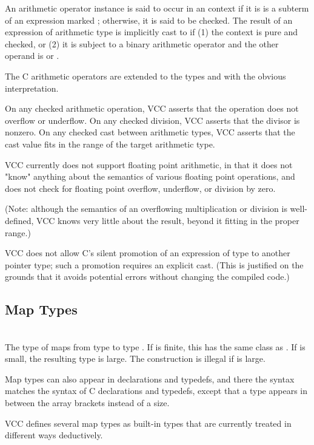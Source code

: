 \documentclass[preprint,nocopyrightspace]{sigplanconf}
\begin{document}
{An arithmetic operator instance is said to occur in
an \vcc{\unchecked} context if it is is a subterm of an expression
marked ; otherwise, it is said to be checked. The
result of an expression of arithmetic type is implicitly cast
to \vcc{\integer} if (1) the context is pure and checked, or (2) it is
subject to a binary arithmetic operator and the other operand
is \vcc{\natural} or \vcc{\integer}.

The C arithmetic operators are extended to the types \vcc{\natural}
and \vcc{\integer} with the obvious interpretation. 

On any checked arithmetic operation, VCC asserts that the operation
does not overflow or underflow. On any checked division, VCC asserts
that the divisor is nonzero. On any checked cast between arithmetic
types, VCC asserts that the cast value fits in the range of the target
arithmetic type. 

VCC currently does not support floating point arithmetic, in that it
does not "know" anything about the semantics of various floating point
operations, and does not check for floating point overflow, underflow,
or division by zero.

(Note: although the semantics of an overflowing multiplication or
division is well-defined, VCC knows very little about the result,
beyond it fitting in the proper range.)

VCC does not allow C's silent promotion of an expression of
type  to another pointer type; such a promotion requires
an explicit cast. (This is justified on the grounds that it avoids
potential errors without changing the compiled code.)

\subsection{Map Types}
\\
The type of maps from type  to type . If  is
finite, this has the same class as . If  is small, the
resulting type is large. The construction is illegal if  is
large.

Map types can also appear in
declarations and typedefs, and there the syntax matches the syntax of
C declarations and typedefs, except that a type appears in between the
array brackets instead of a size.

VCC defines several map types as built-in types that are currently
treated in different ways deductively.

}
\end{document}
